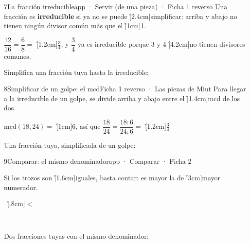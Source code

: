 \documentclass[12pt]{article}
\providecommand{\dv}{\mathbin{:}}
\begin{document}
\begin{cromo}{7}{La fracción irreducible}{app · Servir (de una pieza) · Ficha 1 reverso}
\completa Una fracción es \textbf{irreducible} si ya no se puede \h[2.4cm]{simplificar}: arriba y abajo no tienen ningún divisor común más que el \h[1cm]{1}.\par\vspace{2mm}
$\dfrac{12}{16} = \dfrac{6}{8} =$ \h[1.2cm]{$\frac{3}{4}$}, y $\dfrac{3}{4}$ ya es irreducible porque 3 y 4 \h[4.2cm]{no tienen divisores comunes}.

\vspace{2mm}
\tuejemplo Simplifica una fracción tuya hasta la irreducible:
\end{cromo}

\begin{cromobrillante}{8}{Simplificar de un golpe: el mcd}{Ficha 1 reverso · Las piezas de Miut}
\completa Para llegar a la irreducible de un golpe, se divide arriba y abajo entre el \h[1.4cm]{mcd} de los dos.\par\vspace{2mm}
$\text{mcd}(18, 24) =$ \h[1cm]{6}, así que $\dfrac{18}{24} = \dfrac{18\dv 6}{24\dv 6} =$ \h[1.2cm]{$\frac{3}{4}$}

\vspace{2mm}
\tuejemplo Una fracción tuya, simplificada de un golpe:
\espacio[1.2cm]{$\dfrac{20}{30}$: mcd(20, 30) = 10, y $\dfrac{20\dv 10}{30\dv 10} = \dfrac{2}{3}$.}
\end{cromobrillante}

\begin{cromo}{9}{Comparar: el mismo denominador}{app · Comparar · Ficha 2}
\begin{minipage}[c]{.6\linewidth}\raggedright
\completa Si los trozos son \h[1.6cm]{iguales}, basta contar: es mayor la de \h[3cm]{mayor numerador}.\par\vspace{2mm}
\ \h[.8cm]{$<$}\ 
\end{minipage}%
\begin{minipage}[c]{.4\linewidth}\centering{}\ \end{minipage}

\vspace{2mm}
\tuejemplo Dos fracciones tuyas con el mismo denominador:
\end{cromo}
\end{document}
